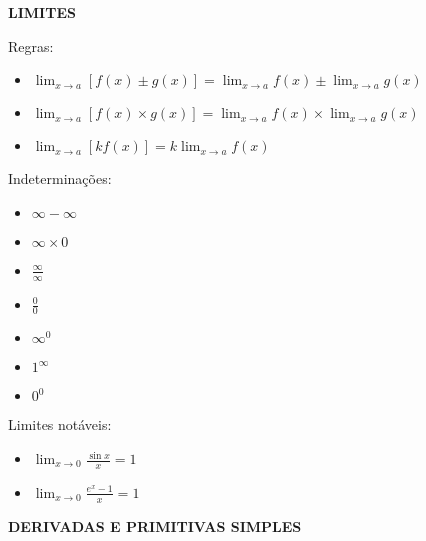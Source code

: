 \documentclass[11pt]{article}
\begin{document}
\textbf{\MakeUppercase{Limites}}

Regras:

\begin{itemize}
    \item $\displaystyle \lim_{x \to a} [f(x) \pm g(x)] = \lim_{x \to a} f(x) \pm \lim_{x \to a} g(x)$
    \item $\displaystyle \lim_{x \to a} [f(x) \times g(x)] = \lim_{x \to a} f(x) \times \lim_{x \to a} g(x)$
    \item $\displaystyle \lim_{x \to a} [k f(x)] = k \lim_{x \to a} f(x) $
\end{itemize}

Indeterminações:

\begin{itemize}
    \item $\infty - \infty$
    \item $\infty \times 0$
    \item $\displaystyle \frac{\infty}{\infty}$
    \item $\displaystyle \frac{0}{0}$
    \item $\infty^0$
    \item $1^\infty$
    \item $0^0$
\end{itemize}

Limites notáveis:

\begin{itemize}
    \item $\displaystyle \lim_{x \to 0} \frac{\sin x}{x} = 1$
    \item $\displaystyle \lim_{x \to 0} \frac{e^x - 1}{x} = 1$
\end{itemize}

\newpage

\textbf{\MakeUppercase{Derivadas e Primitivas Simples}}
\end{document}
